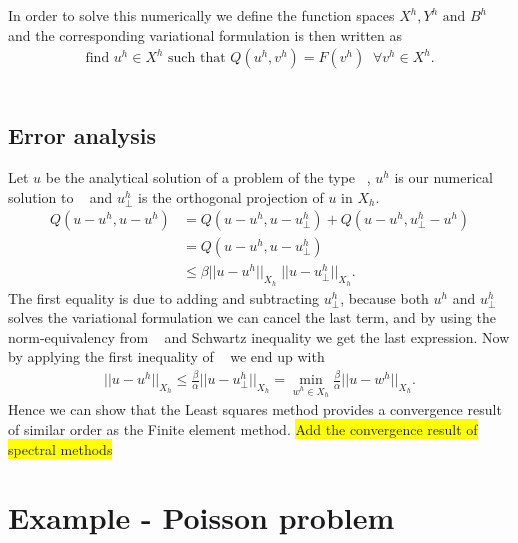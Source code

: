 In order to solve this numerically we define the function spaces $X^h, Y^h \text{ and } B^h$ and the corresponding variational formulation is then written as 
\begin{align}
	\text{find } u^h \in X^h \text{  such that  } Q(u^h,v^h) = F(v^h) \; \; \forall v^h\in X^h.
	\label{eq:varFormGenDisc}
\end{align}
~\cite{Bochev}
%
\subsection{Error analysis}
Let $u$ be the analytical solution of a problem of the type ~, $u^h$ is our numerical solution to ~ and $u^h_{\perp} $ is the orthogonal projection of $u$ in $X_h$. 
\begin{align}
	Q(u-u^h,u-u^h) &= Q(u-u^h,u-u^h_{\perp}) + Q(u-u^h,u^h_{\perp}-u^h) \\
							   &= Q(u-u^h,u-u^h_{\perp}) \\
							 	 &\leq \beta ||u-u^h||_{X_h} \; ||u-u^h_{\perp}||_{X_h}.
	\label{eq:error1}
\end{align}
The first equality is due to adding and subtracting $u^h_{\perp}$, because both $u^h$ and $u^h_{\perp}$ solves the variational formulation we can cancel the last term, and by using the norm-equivalency from ~ and Schwartz inequality we get the last  expression. Now by applying the first inequality of ~ we end up with 
\begin{align}
	||u-u^h||_{X_h}\leq \frac{\beta}{\alpha}||u-u^h_{\perp}||_{X_h} = \min_{w^h \in X_h}\frac{\beta}{\alpha}||u-w^h||_{X_h}.
	\label{error_final}
\end{align}
Hence we can show that the Least squares method provides a convergence result of similar order as the Finite element method.
\colorbox{yellow}{Add the convergence result of spectral methods}


\section{Example - Poisson problem}

